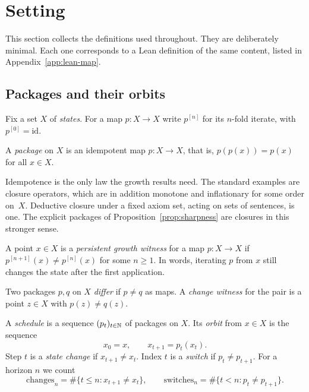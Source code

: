 \section{Setting}\label{sec:setting}

This section collects the definitions used throughout. They are deliberately minimal. Each one corresponds to a Lean definition of the same content, listed in Appendix~\ref{app:lean-map}.

\subsection{Packages and their orbits}

Fix a set $X$ of \emph{states}. For a map $p\colon X\to X$ write $p^{[n]}$ for its $n$-fold iterate, with $p^{[0]}=\mathrm{id}$.

\begin{definition}[Package]\label{def:package}
A \emph{package} on $X$ is an idempotent map $p\colon X\to X$, that is, $p(p(x))=p(x)$ for all $x\in X$.
\end{definition}

Idempotence is the only law the growth results need. The standard examples are closure operators, which are in addition monotone and inflationary for some order on~$X$. Deductive closure under a fixed axiom set, acting on sets of sentences, is one. The explicit packages of Proposition~\ref{prop:sharpness} are closures in this stronger sense.

\begin{definition}\label{def:growth-witness}
A point $x\in X$ is a \emph{persistent growth witness} for a map $p\colon X\to X$ if $p^{[n+1]}(x)\neq p^{[n]}(x)$ for some $n\ge 1$. In words, iterating $p$ from $x$ still changes the state after the first application.
\end{definition}

\begin{definition}\label{def:package-change}
Two packages $p,q$ on $X$ \emph{differ} if $p\neq q$ as maps. A \emph{change witness} for the pair is a point $z\in X$ with $p(z)\neq q(z)$.
\end{definition}

\begin{definition}\label{def:schedule}
A \emph{schedule} is a sequence $(p_t)_{t\in\mathbb{N}}$ of packages on $X$. Its \emph{orbit} from $x\in X$ is the sequence
\[
x_0=x,\qquad x_{t+1}=p_t(x_t).
\]
Step $t$ is a \emph{state change} if $x_{t+1}\neq x_t$. Index $t$ is a \emph{switch} if $p_t\neq p_{t+1}$. For a horizon $n$ we count
\[
\mathrm{changes}_n=\#\{t\le n: x_{t+1}\neq x_t\},\qquad
\mathrm{switches}_n=\#\{t<n: p_t\neq p_{t+1}\}.
\]
\end{definition}

